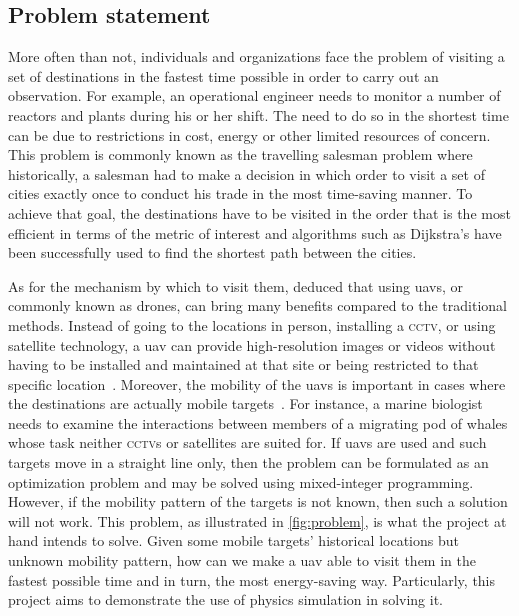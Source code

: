 \documentclass[../main.tex]{subfiles}
\begin{document}
\subsection{Problem statement}

More often than not, individuals and organizations face the problem
of visiting a set of destinations in the fastest time possible
in order to carry out an observation.
For example, an operational engineer needs to monitor
a number of reactors and plants during his or her shift.
The need to do so in the shortest time can be due to restrictions in
cost, energy or other limited resources of concern.
This problem is commonly known as the travelling salesman problem
where historically, a salesman had to make a decision in which order
to visit a set of cities exactly once to conduct his trade
in the most time-saving manner.
To achieve that goal, the destinations have to be visited in the order
that is the most efficient in terms of the metric of interest
and algorithms such as Dijkstra's have been successfully used 
to find the shortest path between the cities.

As for the mechanism by which to visit them, 
\textcite{Sha19} deduced that using \glspl{uav}, 
or commonly known as drones,
can bring many benefits 
compared to the traditional methods.
Instead of going to the locations in person, installing a \textsc{cctv},
or using satellite technology, a \gls{uav} can provide
high-resolution images or videos without 
having to be installed and maintained at that site
or being restricted to that specific location~\cite{Sha19}.
Moreover, the mobility of the \glspl{uav} is important
in cases where the destinations are actually mobile targets~\cite{Sha19}.
For instance, a marine biologist needs to examine 
the interactions between members of a migrating 
pod of whales whose task neither \textsc{cctv}s 
or satellites are suited for.
If \glspl{uav} are used and such targets move 
in a straight line only,
then the problem can be formulated as 
an optimization problem
and may be solved using mixed-integer programming.
However, if the mobility pattern of the targets is not known,
then such a solution will not work.
This problem, as illustrated in \cref{fig:problem}, 
is what the project at hand intends to solve.
Given some mobile targets' historical locations 
but unknown mobility pattern,
how can we make a \gls{uav} able to visit them
in the fastest possible time and in turn, the most energy-saving way. 
Particularly, this project aims to demonstrate the 
use of physics simulation in solving it. 
\end{document}
